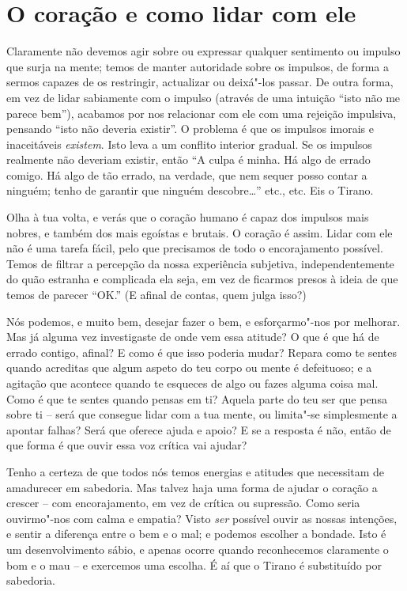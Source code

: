 \section{O coração e como lidar com
ele}

Claramente não devemos agir sobre ou expressar qualquer sentimento ou
impulso que surja na mente; temos de manter autoridade sobre os
impulsos, de forma a sermos capazes de os restringir, actualizar ou
deixá"-los passar. De outra forma, em vez de lidar sabiamente com o
impulso (através de uma intuição “isto não me parece bem”), acabamos por
nos relacionar com ele com uma rejeição impulsiva, pensando “isto não
deveria existir”. O problema é que os impulsos imorais e inaceitáveis
\emph{existem}. Isto leva a um conflito interior gradual. Se os impulsos
realmente não deveriam existir, então “A culpa é minha. Há algo de
errado comigo. Há algo de tão errado, na verdade, que nem sequer posso
contar a ninguém; tenho de garantir que ninguém descobre\ldots{}” etc., etc.
Eis o Tirano.

Olha à tua volta, e verás que o coração humano é capaz dos impulsos mais
nobres, e também dos mais egoístas e brutais. O coração é assim. Lidar
com ele não é uma tarefa fácil, pelo que precisamos de todo o
encorajamento possível. Temos de filtrar a percepção da nossa
experiência subjetiva, independentemente do quão estranha e complicada
ela seja, em vez de ficarmos presos à ideia de que temos de parecer
“OK.” (E afinal de contas, quem julga isso?)

Nós podemos, e muito bem, desejar fazer o bem, e esforçarmo"-nos por
melhorar. Mas já alguma vez investigaste de onde vem essa atitude? O que
é que há de errado contigo, afinal? E como é que isso poderia mudar?
Repara como te sentes quando acreditas que algum aspeto do teu corpo ou
mente é defeituoso; e a agitação que acontece quando te esqueces de algo
ou fazes alguma coisa mal. Como é que te sentes quando pensas em ti?
Aquela parte do teu ser que pensa sobre ti -- será que consegue lidar
com a tua mente, ou limita"-se simplesmente a apontar falhas? Será que
oferece ajuda e apoio? E se a resposta é não, então de que forma é que
ouvir essa voz crítica vai ajudar?

\sectionBreak

Tenho a certeza de que todos nós temos energias e atitudes que
necessitam de amadurecer em sabedoria. Mas talvez haja uma forma de
ajudar o coração a crescer -- com encorajamento, em vez de crítica ou
supressão. Como seria ouvirmo"-nos com calma e empatia? Visto \emph{ser}
possível ouvir as nossas intenções, e sentir a diferença entre o bem e o
mal; e podemos escolher a bondade. Isto é um desenvolvimento sábio, e
apenas ocorre quando reconhecemos claramente o bom e o mau -- e
exercemos uma escolha. É aí que o Tirano é substituído por sabedoria.

